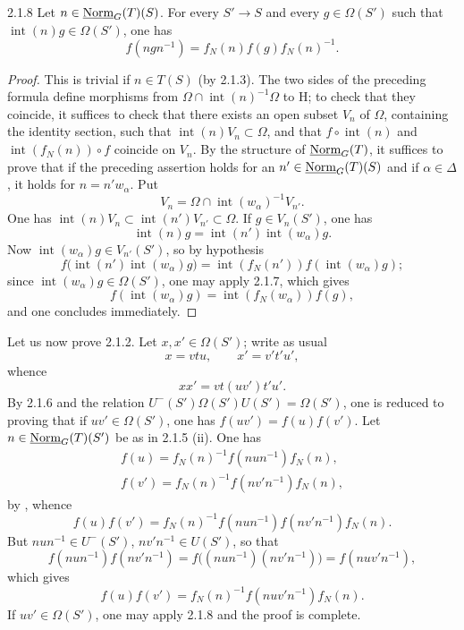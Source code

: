 \begin{lemma}{2.1.8}\label{XXIII.2.1.8}
Let $n\in\underline{\mathrm{Norm}}_G(T)(S)$. For every $S'\to S$ and every $g\in\Omega(S')$ such that $\operatorname{int}(n)g\in\Omega(S')$, one has
\[
f(ngn^{-1})=f_N(n)f(g)f_N(n)^{-1}.
\]
\end{lemma}
\begin{proof}
This is trivial if $n\in T(S)$ (by 2.1.3). The two sides of the preceding formula define morphisms from $\Omega\cap\operatorname{int}(n)^{-1}\Omega$ to H; to check that they coincide, it suffices to check that there exists an open subset $V_n$ of $\Omega$, containing the identity section, such that $\operatorname{int}(n)V_n\subset\Omega$, and that $f\circ\operatorname{int}(n)$ and $\operatorname{int}(f_N(n))\circ f$ coincide on $V_n$. By the structure of $\underline{\mathrm{Norm}}_G(T)$, it suffices to prove that if the preceding assertion holds for an $n'\in\underline{\mathrm{Norm}}_G(T)(S)$ and if $\alpha\in\Delta$, it holds for $n=n'w_\alpha$. Put
\[
V_n=\Omega\cap\operatorname{int}(w_\alpha)^{-1}V_{n'}.
\]
One has $\operatorname{int}(n)V_n\subset\operatorname{int}(n')V_{n'}\subset\Omega$. If $g\in V_n(S')$, one has
\[
\operatorname{int}(n)g=\operatorname{int}(n')\operatorname{int}(w_\alpha)g.
\]
Now $\operatorname{int}(w_\alpha)g\in V_{n'}(S')$, so by hypothesis
\[
f\bigl(\operatorname{int}(n')\operatorname{int}(w_\alpha)g\bigr)
=\operatorname{int}(f_N(n'))f(\operatorname{int}(w_\alpha)g);
\]
since $\operatorname{int}(w_\alpha)g\in\Omega(S')$, one may apply 2.1.7, which gives
\[
f(\operatorname{int}(w_\alpha)g)=\operatorname{int}(f_N(w_\alpha))f(g),
\]
and one concludes immediately.
\end{proof}

Let us now prove 2.1.2. Let $x,x'\in\Omega(S')$; write as usual
\[
x=vtu,\qquad x'=v't'u',
\]
whence
\[
xx'=vt(uv')t'u'.
\]
By 2.1.6 and the relation $U^-(S')\Omega(S')U(S')=\Omega(S')$, one is reduced to proving that if $uv'\in\Omega(S')$, one has $f(uv')=f(u)f(v')$. Let $n\in\underline{\mathrm{Norm}}_G(T)(S')$ be as in 2.1.5 (ii).
One has
\[
\begin{gathered}
f(u)=f_N(n)^{-1}f(nun^{-1})f_N(n),\\
f(v')=f_N(n)^{-1}f(nv'n^{-1})f_N(n),
\end{gathered}
\]
by \loccit, whence
\[
f(u)f(v')=f_N(n)^{-1}f(nun^{-1})f(nv'n^{-1})f_N(n).
\]
But $nun^{-1}\in U^-(S')$, $nv'n^{-1}\in U(S')$, so that
\[
f(nun^{-1})f(nv'n^{-1})=f\bigl((nun^{-1})(nv'n^{-1})\bigr)=f(nuv'n^{-1}),
\]
which gives
\[
f(u)f(v')=f_N(n)^{-1}f(nuv'n^{-1})f_N(n).
\]
If $uv'\in\Omega(S')$, one may apply 2.1.8 and the proof is complete.

